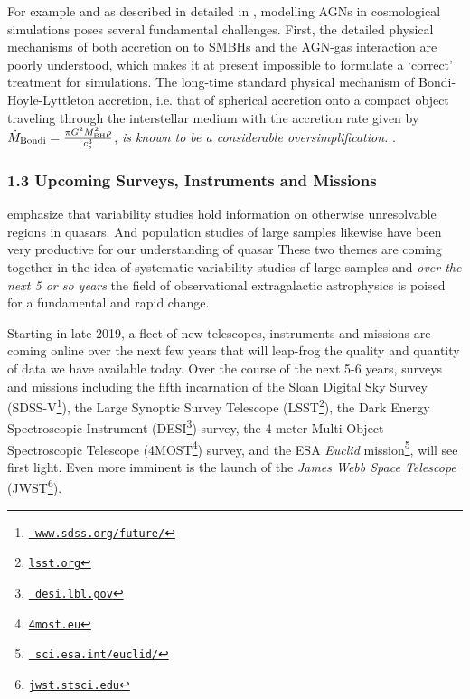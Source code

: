 \smallskip
\smallskip
\noindent
For example and as described in detailed in \citet{Weinberger2017},
modelling AGNs in cosmological simulations poses several fundamental
challenges. First, the detailed physical mechanisms of both accretion
on to SMBHs \citep{Hopkins_Quataert2010, Hopkins_Quataert2011,
Angles-Alcazar2013, Gaspari2013, Angles-Alcazar2015,
Angles-Alcazar2017, CurtisSijacki2015, CurtisSijacki2016a,
CurtisSijacki2016b, Emsellem2015, Rosas-Guevara2015} and the AGN-gas
interaction \citep{Huarte-Espinosa2011, Gaibler2012, Cielo2014,
Costa2014, Roos2015, Hopkins2016, Bieri2017} are poorly understood,
which makes it at present impossible to formulate a `correct'
treatment for simulations.  The long-time standard physical mechanism
of Bondi-Hoyle-Lyttleton accretion, i.e. that of spherical accretion
onto a compact object traveling through the interstellar medium
\citep{Hoyle_Lyttleton1939, Bondi_Hoyle1944, Bondi1952} with the
accretion rate given by $\dot {M}_{\rm Bondi} = \frac{\pi G^{2 }M_{\rm
BH}^{2} \rho }{c_{s}^{3}} $, {\it is known to be a considerable
oversimplification.} \citep[e.g.,][]{Edgar2004}.


\subsubsection*{1.3 Upcoming Surveys, Instruments and Missions}
\smallskip
\smallskip
\noindent
\citep{Lawrence2016_ASPC} emphasize that variability studies hold
information on otherwise unresolvable regions in quasars. And
population studies of large samples likewise have been very productive
for our understanding of quasar These two themes are coming together
in the idea of systematic variability studies of large samples and
{\it over the next 5 or so years} the field of observational
extragalactic astrophysics is poised for a fundamental and rapid
change.


\smallskip
\smallskip
\noindent
Starting in late 2019, a fleet of new telescopes, instruments and missions are coming 
online over the next few years that will leap-frog the quality and
quantity of data we have available today. Over the course of the next
5-6 years, surveys and missions including the fifth incarnation of the
Sloan Digital Sky Survey
(SDSS-V\footnote{\href{www.sdss.org/future/}{{\tt
www.sdss.org/future/}}}), the Large Synoptic Survey Telescope
(LSST\footnote{\href{lsst.org}{{\tt lsst.org}}}), the Dark Energy
Spectroscopic Instrument (DESI\footnote{\href{desi.lbl.gov}{{\tt
desi.lbl.gov}}}) survey, the 4-meter Multi-Object Spectroscopic
Telescope (4MOST\footnote{\href{4most.eu}{{\tt 4most.eu}}}) survey,
and the ESA {\it Euclid}
mission\footnote{\href{sci.esa.int/euclid/}{{\tt
sci.esa.int/euclid/}}}, will see first light. Even more imminent is
the launch of the {\it James Webb Space Telescope}
(JWST\footnote{\href{jwst.stsci.edu}{{\tt jwst.stsci.edu}}}).




